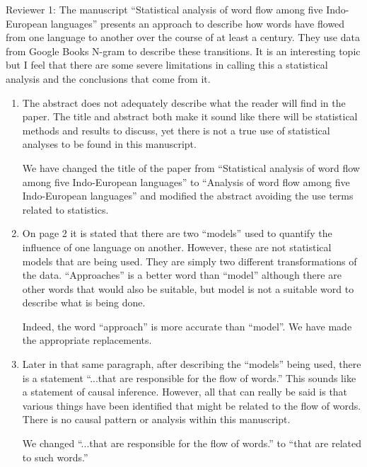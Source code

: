 \documentclass{article}
\begin{document}
	
Reviewer 1: The manuscript “Statistical analysis of word flow among five
Indo-European languages” presents an approach to describe how words have flowed
from one language to another over the course of at least a century. They use
data from Google Books N-gram to describe these transitions. It is an
interesting topic but I feel that there are some severe limitations in calling
this a statistical analysis and the conclusions that come from it.

\begin{enumerate}
	
\item The abstract does not adequately describe what the reader
will find in the paper. The title and abstract both make it sound like there
will be statistical methods and results to discuss, yet there is not a true use
of statistical analyses to be found in this manuscript.

We have changed the title of the paper from 
``Statistical analysis of word flow among five Indo-European languages'' to 
``Analysis of word flow among five Indo-European languages'' and modified the abstract avoiding
the use terms related to statistics.
\item On page 2 it is stated that there are two ``models'' used to quantify
the influence of one language on another. However, these are not
statistical models that are being used. They are simply two different
transformations of the data. “Approaches” is a better word than
``model'' although there are other words that would also be suitable,
but model is not a suitable word to describe what is being done.

Indeed, the word ``approach'' is more accurate than ``model''. We have made 
the appropriate replacements. 
\item Later in that same paragraph, after describing the “models” being
used, there is a statement ``...that are responsible for the flow of
words.'' This sounds like a statement of causal inference. However, all
that can really be said is that various things have been identified
that might be related to the flow of words. There is no causal pattern
or analysis within this manuscript.

We changed ``...that are responsible for the flow of words.'' to 
``that are related to such words.''


\end{enumerate}
\end{document}
